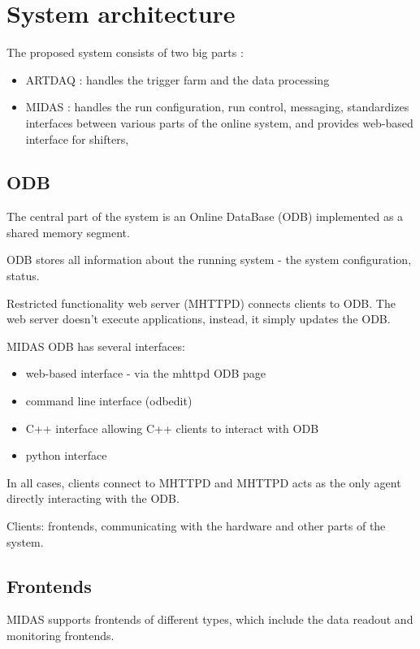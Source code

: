 \section{System architecture}

The proposed system consists of two big parts :
\begin{itemize}
\item
  ARTDAQ : handles the trigger farm and the data processing
\item
  MIDAS : handles the run configuration, run control, messaging,
  standardizes interfaces between various parts of the online system,
  and provides web-based interface for shifters,
\end{itemize}

\subsection{ODB} 
The central part of the system is an Online DataBase (ODB)
implemented as a shared memory segment.

ODB stores all information about the running system -
the system configuration, status.

Restricted functionality web server (MHTTPD) connects clients
to ODB. The web server doesn't execute applications, instead,
it simply updates the ODB.

MIDAS ODB has several interfaces:
\begin{itemize}
\item 
  web-based interface - via the mhttpd ODB page
\item
  command line interface (odbedit)
\item
  C++ interface allowing C++ clients to interact with ODB
\item
  python interface
\end{itemize}

In all cases, clients connect to MHTTPD and MHTTPD acts as
the only agent directly interacting with the ODB.

Clients: frontends, communicating with the hardware and other
parts of the system.


\subsection{Frontends}

MIDAS supports frontends of different types, which include the data readout and monitoring
frontends.

